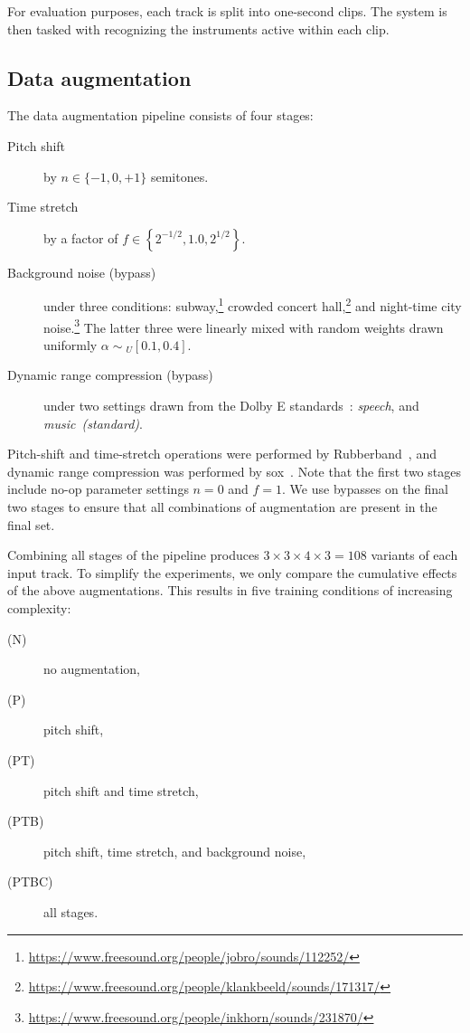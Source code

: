 \documentclass{article}
\begin{document}
For evaluation purposes, each track is split into one-second clips.
The system is then tasked with recognizing the instruments active within each clip.

\subsection{Data augmentation}

The data augmentation pipeline consists of four stages:

\begin{description}
    \item[Pitch shift] by $n \in \{-1, 0, +1\}$ semitones.
    \item[Time stretch] by a factor of $f \in \left\{ 2^{-1/2}, 1.0, 2^{1/2}\right\}$.
    \item[Background noise (bypass)] under three conditions:
        subway,\footnote{\url{https://www.freesound.org/people/jobro/sounds/112252/}}
        crowded concert hall,\footnote{\url{https://www.freesound.org/people/klankbeeld/sounds/171317/}}
        and night-time city noise.\footnote{\url{https://www.freesound.org/people/inkhorn/sounds/231870/}}
        The latter three were linearly mixed with random weights drawn uniformly
        $\alpha \sim { }_U[0.1, 0.4]$.
    \item[Dynamic range compression (bypass)] under two settings drawn from the {Dolby E}
        standards~\cite{dolbyE}: \emph{speech},
        and \emph{music~(standard)}.
\end{description}

Pitch-shift and time-stretch operations were performed by Rubberband~\cite{rubberband}, and dynamic range
compression was performed by sox~\cite{sox}.
Note that the first two stages include no-op parameter settings $n=0$ and $f=1$.  We use
bypasses on the final two stages to ensure that all combinations of augmentation are
present in the final set.

Combining all stages of the pipeline produces {$3\times 3\times 4\times 3 = 108$} variants of each input track.  To
simplify the experiments, we only compare the cumulative effects of the above
augmentations.  This results in five training conditions of increasing complexity:
\begin{description}
    \item[(N)] no augmentation,
        \vspace{-.5\baselineskip}
    \item[(P)] pitch shift,
        \vspace{-.5\baselineskip}
    \item[(PT)] pitch shift and time stretch,
        \vspace{-.5\baselineskip}
    \item[(PTB)] pitch shift, time stretch, and background noise,
        \vspace{-.5\baselineskip}
    \item[(PTBC)] all stages.
\end{description}
\end{document}
